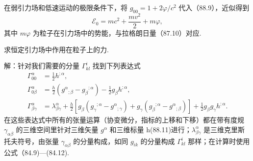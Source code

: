 在弱引力场和低速运动的极限条件下，将 $g_{00}=1+2\varphi/c^2$ 代入（88.9），近似得到
\begin{equation}
  \mathcal{E}_0=mc^2+\frac{mv^2}{2}+m\varphi,
\end{equation}
其中 $m\varphi$ 为粒子在引力场中的势能，与拉格朗日量（87.10）对应.

\begin{xiti}

\quad 求恒定引力场中作用在粒子上的力.

解：针对我们需要的分量 $\Gamma^i_{kl}$ 找到下列表达式
\begin{equation*}
\begin{aligned}
  \Gamma^{\alpha}_{00}&=\frac{1}{2}h^{;\alpha},\\
  \Gamma^{\alpha}_{0\beta}
  &=\frac{h}{2}\left(g^{\alpha}{}_{;\beta}
  -g_{\beta}{}^{;\alpha}\right)
  -\frac{1}{2}g_{\beta}h^{;\alpha},\\
  \Gamma^{\alpha}_{\beta\gamma}
  &=\lambda^{\alpha}_{\beta\gamma}
  +\frac{h}{2}\left[g_{\beta}\left(g_{\gamma}{}^{;\alpha}
  -g^{\alpha}{}_{;\gamma}\right)
  +g_{\gamma}\left(g_{\beta}{}^{;\alpha}
  -g^{\alpha}{}_{;\beta}\right)\right]
  +\frac{1}{2}g_{\beta}g_{\gamma}h^{;\alpha}.
\end{aligned}\tag{1}
\end{equation*}
在这些表达式中所有的张量运算（协变微分，指标的上移和下移）都在带有度规 $\gamma_{\alpha\beta}$ 的三维空间里针对三维矢量 $g^{\alpha}$ 和三维标量 h(88.11)进行；$\lambda^{\alpha}_{\beta\gamma}$ 是三维克里斯托夫符号，由张量 $\gamma_{\alpha\beta}$ 的分量构成，如同 $g_{ik}$ 的分量构成 $\Gamma^i_{kl}$ 那样；在计算时使用公式（84.9)—(84.12).


\end{xiti}
